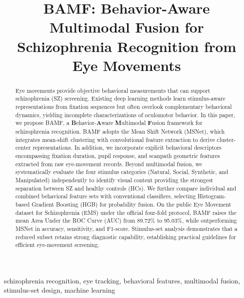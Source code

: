 \documentclass[conference,a4paper]{IEEEtran}
\begin{document}
\title{BAMF: Behavior-Aware Multimodal Fusion for Schizophrenia Recognition from Eye Movements}

\author{
}

\maketitle

\begin{abstract}
Eye movements provide objective behavioral measurements that can support schizophrenia (SZ) screening. Existing deep learning methods learn stimulus-aware representations from fixation sequences but often overlook complementary behavioral dynamics, yielding incomplete characterizations of oculomotor behavior. In this paper, we propose BAMF, a \textbf{B}ehavior-\textbf{A}ware \textbf{M}ultimodal \textbf{F}usion framework for schizophrenia recognition. BAMF adopts the Mean Shift Network (MSNet), which integrates mean-shift clustering with convolutional feature extraction to derive cluster-center representations. In addition, we incorporate explicit behavioral descriptors encompassing fixation duration, pupil response, and scanpath geometric features extracted from raw eye-movement records. Beyond multimodal fusion, we systematically evaluate the four stimulus categories (Natural, Social, Synthetic, and Manipulated) independently to identify visual content providing the strongest separation between SZ and healthy controls (HCs). We further compare individual and combined behavioral feature sets with conventional classifiers, selecting Histogram-based Gradient Boosting (HGB) for probability fusion. On the public Eye Movement dataset for Schizophrenia (EMS) under the official four-fold protocol, BAMF raises the mean Area Under the ROC Curve (AUC) from 89.72\% to 95.03\%, while outperforming MSNet in accuracy, sensitivity, and F1-score. Stimulus-set analysis demonstrates that a reduced subset retains strong diagnostic capability, establishing practical guidelines for efficient eye-movement screening.
\end{abstract}

\begin{IEEEkeywords}
schizophrenia recognition, eye tracking, behavioral features, multimodal fusion, stimulus-set design, machine learning
\end{IEEEkeywords}
\end{document}
